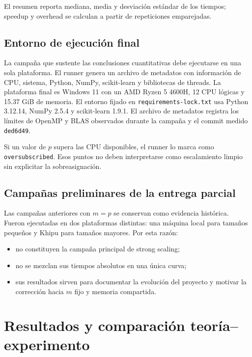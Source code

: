 \documentclass[11pt,a4paper]{article}
\begin{document}
El resumen reporta mediana, media y desviación estándar de los tiempos; speedup y
overhead se calculan a partir de repeticiones emparejadas.

\subsection{Entorno de ejecución final}

La campaña que sustente las conclusiones cuantitativas debe ejecutarse en una sola
plataforma. El runner genera un archivo de metadatos con información de CPU, sistema,
Python, NumPy, scikit-learn y bibliotecas de threads. La plataforma final es
Windows 11 con un AMD Ryzen 5 4600H, 12 CPU lógicas y 15.37 GiB de memoria.
El entorno fijado en \texttt{requirements-lock.txt} usa Python 3.12.14,
NumPy 2.5.4 y scikit-learn 1.9.1. El archivo de metadatos registra los límites
de OpenMP y BLAS observados durante la campaña y el commit medido
\texttt{ded6d49}.

Si un valor de $p$ supera las CPU disponibles, el runner lo marca como
\texttt{oversubscribed}. Esos puntos no deben interpretarse como escalamiento limpio sin
explicitar la sobreasignación.

\subsection{Campañas preliminares de la entrega parcial}

Las campañas anteriores con $m=p$ se conservan como evidencia histórica. Fueron
ejecutadas en dos plataformas distintas: una máquina local para tamaños pequeños y
Khipu para tamaños mayores. Por esta razón:

\begin{itemize}[leftmargin=*]
    \item no constituyen la campaña principal de strong scaling;
    \item no se mezclan sus tiempos absolutos en una única curva;
    \item sus resultados sirven para documentar la evolución del proyecto y motivar
    la corrección hacia $m$ fijo y memoria compartida.
\end{itemize}


\section{Resultados y comparación teoría--experimento}
\end{document}
